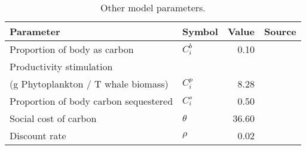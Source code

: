 \begin{table}

\caption{\label{tab:global_params}Other model parameters.}
\centering
\begin{tabular}[t]{llrl}
\toprule
Parameter & Symbol & Value & Source\\
\midrule
Proportion of body as carbon & $C_i^b$ & 0.10 & \citet{jelmert1996whaling}\\
Productivity stimulation\\(g Phytoplankton / T whale biomass) & $C_i^p$ & 8.28 & \citet{savoca2021baleen}\\
Proportion of body carbon sequestered & $C_i^s$ & 0.50 & \citet{jelmert1996whaling}\\
Social cost of carbon & $\theta$ & 36.60 & \citet{carleton2020valuing}\\
Discount rate & $\rho$ & 0.02 & \citet{carleton2020valuing}\\
\bottomrule
\end{tabular}
\end{table}